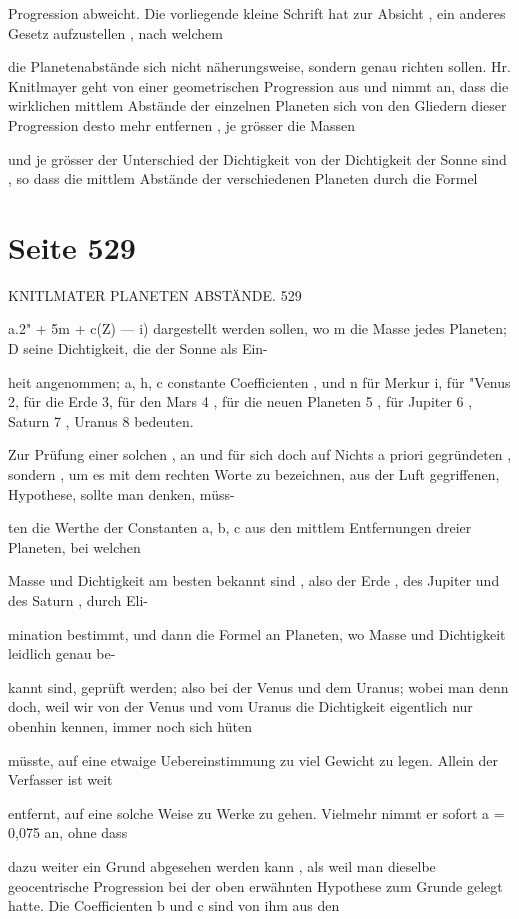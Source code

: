 \documentclass[10pt,a4paper]{article}
\begin{document}
Progression abweicht. Die vorliegende kleine Schrift hat zur Absicht , ein anderes Gesetz aufzustellen , nach welchem

die Planetenabstände sich nicht näherungsweise, sondern genau richten sollen. Hr. Knitlmayer geht von einer geometrischen Progression aus und nimmt an, dass die wirklichen mittlem Abstände der einzelnen Planeten sich von den Gliedern dieser Progression desto mehr entfernen , je grösser die Massen

und je grösser der Unterschied der Dichtigkeit von der Dichtigkeit der Sonne sind , so dass die mittlem Abstände der verschiedenen Planeten durch die Formel


\newpage
\section*{Seite 529}
KNITLMATER PLANETEN ABSTÄNDE. 529

a.2" + 5m + c(Z) — i) dargestellt werden sollen, wo m die Masse jedes Planeten; D seine Dichtigkeit, die der Sonne als Ein-

heit angenommen; a, h, c constante Coefficienten , und n für Merkur i, für "Venus 2, für die Erde 3, für den Mars 4 , für die neuen Planeten 5 , für Jupiter 6 , Saturn 7 , Uranus 8 bedeuten.

Zur Prüfung einer solchen , an und für sich doch auf Nichts a priori gegründeten , sondern , um es mit dem rechten Worte zu bezeichnen, aus der Luft gegriffenen, Hypothese, sollte man denken, müss-

ten die Werthe der Constanten a, b, c aus den mittlem Entfernungen dreier Planeten, bei welchen

Masse und Dichtigkeit am besten bekannt sind , also der Erde , des Jupiter und des Saturn , durch Eli-

mination bestimmt, und dann die Formel an Planeten, wo Masse und Dichtigkeit leidlich genau be-

kannt sind, geprüft werden; also bei der Venus und dem Uranus; wobei man denn doch, weil wir von der Venus und vom Uranus die Dichtigkeit eigentlich nur obenhin kennen, immer noch sich hüten

müsste, auf eine etwaige Uebereinstimmung zu viel Gewicht zu legen. Allein der Verfasser ist weit

entfernt, auf eine solche Weise zu Werke zu gehen. Vielmehr nimmt er sofort a = 0,075 an, ohne dass

dazu weiter ein Grund abgesehen werden kann , als weil man dieselbe geocentrische Progression bei der oben erwähnten Hypothese zum Grunde gelegt hatte. Die Coefficienten b und c sind von ihm aus den
\end{document}
